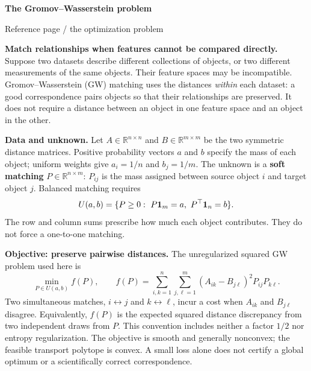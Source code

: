 {\color{ink}\fontsize{19}{22}\selectfont\bfseries The Gromov--Wasserstein problem\par}
{\small\color{muted}Reference page \enspace / \enspace the optimization problem\par}
\vspace{8pt}

\textbf{Match relationships when features cannot be compared directly.}
Suppose two datasets describe different collections of objects, or two different
measurements of the same objects. Their feature spaces may be incompatible.
Gromov--Wasserstein (GW) matching uses the distances \emph{within} each dataset:
a good correspondence pairs objects so that their relationships are preserved.
It does not require a distance between an object in one feature space and an
object in the other.

\textbf{Data and unknown.}
Let $A\in\mathbb R^{n\times n}$ and $B\in\mathbb R^{m\times m}$ be the two
symmetric distance matrices. Positive probability vectors $a$ and $b$ specify
the mass of each object; uniform weights give $a_i=1/n$ and $b_j=1/m$.
The unknown is a \textbf{soft matching} $P\in\mathbb R^{n\times m}$:
$P_{ij}$ is the mass assigned between source object $i$ and target object $j$.
Balanced matching requires
\[
 U(a,b)=\{P\geq0:\ P\one_m=a,\ P^\top\one_n=b\}.
\]
The row and column sums prescribe how much each object contributes. They do not
force a one-to-one matching.

\textbf{Objective: preserve pairwise distances.}
The unregularized squared GW problem used here is
\[
 \boxed{\min_{P\in U(a,b)} f(P)},\qquad
 f(P)=\sum_{i,k=1}^{n}\sum_{j,\ell=1}^{m}
       (A_{ik}-B_{j\ell})^2 P_{ij}P_{k\ell}.
\]
Two simultaneous matches, $i\leftrightarrow j$ and $k\leftrightarrow\ell$,
incur a cost when $A_{ik}$ and $B_{j\ell}$ disagree. Equivalently, $f(P)$ is the
expected squared distance discrepancy from two independent draws from $P$.
This convention includes neither a factor $1/2$ nor entropy regularization.
The objective is smooth and generally nonconvex; the feasible transport
polytope is convex. A small loss alone does not certify a global optimum or a
scientifically correct correspondence.

